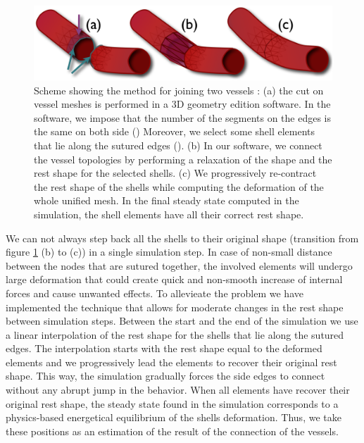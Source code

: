 \begin{figure}[tbh]
\begin{center}
\includegraphics[width=\columnwidth]{img/rest_shape_scheme.png}
\end{center}

\caption{Scheme showing the method for joining two vessels :  (a) the cut on vessel meshes is performed in a 3D geometry edition software. In the software, we impose that the number of the segments on the edges is the same on both side  (\color{BlueGreen}{$\mathbf{\rightarrow}$}\color{black})
Moreover, we select some shell elements that lie along the sutured edges (\color{purple}{$\mathbf{\rightarrow}$}\color{black}).
(b) In our software, we connect the vessel topologies by performing a relaxation of the shape and the rest shape for the selected shells.  
(c) We progressively re-contract the rest shape of the shells while computing the deformation of the whole unified mesh. 
In the final steady state computed in the simulation, the shell elements have all their correct rest shape.}
\label{fig-JoiningVessels}
\end{figure}

We can not always step back all the shells to their original shape (transition from figure \ref{fig-JoiningVessels} (b) to (c))  in a single simulation step. 
In case of non-small distance between the nodes that are sutured together, the involved elements will undergo large deformation that could create quick and non-smooth increase of internal forces and  cause unwanted effects.
To allevieate the problem we have implemented the technique that allows for moderate changes in the rest shape between simulation steps.
Between the start and the end of the simulation we use a linear interpolation of the rest shape for the shells that lie along the sutured edges. 
The interpolation starts with the rest shape equal to the deformed elements and we progressively lead the elements to recover their original rest shape.
This way, the simulation gradually forces the side edges to connect without any abrupt jump in the behavior.
When all elements have recover their original rest shape, the steady state found in the simulation corresponds to a physics-based energetical equilibrium of the shells deformation. 
Thus, we take these positions as an estimation of the result of the connection of the vessels.
